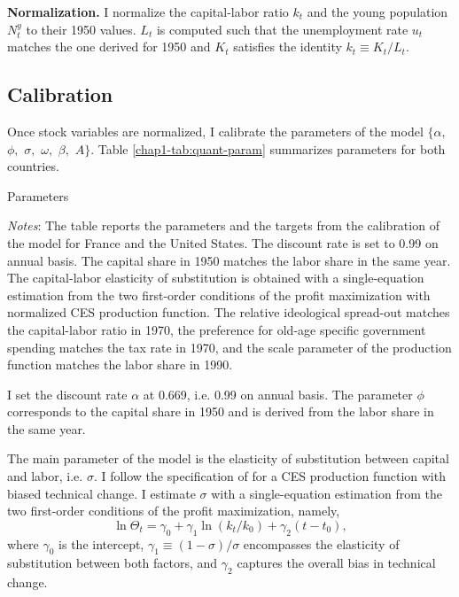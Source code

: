 \textbf{Normalization.} 
I normalize the capital-labor ratio $k_t$ and the young population $N_t^y$ to their 1950 values. $L_t$ is computed such that the unemployment rate $u_t$ matches the one derived for 1950 and $K_t$ satisfies the identity $k_t \equiv K_t/L_t$.

\subsection{Calibration}\label{chap1-calibration}

Once stock variables are normalized, I calibrate the parameters of the model $\{ \alpha,$ $\phi,$ $\sigma,$ $\omega,$ $\beta,$ $A \}$. Table \ref{chap1-tab:quant-param} summarizes parameters for both countries.
\begin{table}[!tb]
    \centering
    \begin{threeparttable}
        \caption{Parameters} \label{chap1-tab:quant-param}
        
        \begin{tablenotes}[flushleft]
            \footnotesize\item \textit{Notes}: The table reports the parameters and the targets from the calibration of the model for France and the United States. The discount rate is set to 0.99 on annual basis. The capital share in 1950 matches the labor share in the same year.
            The capital-labor elasticity of substitution is obtained with a single-equation estimation from the two first-order conditions of the profit maximization with normalized CES production function.
            The relative ideological spread-out matches the capital-labor ratio in 1970, the preference for old-age specific government spending matches the tax rate in 1970, and the scale parameter of the production function matches the labor share in 1990.
        \end{tablenotes}
    \end{threeparttable}
\end{table}
I set the discount rate $\alpha$ at 0.669, i.e. 0.99 on annual basis. 
The parameter $\phi$ corresponds to the capital share in 1950 and is derived from the labor share in the same year. 

The main parameter of the model is the elasticity of substitution between capital and labor, i.e. $\sigma$. I follow the specification of \citet{Klump2007Factor} for a CES production function with biased technical change. %
I estimate $\sigma$ with a single-equation estimation from the two first-order conditions of the profit maximization, namely,
\begin{equation} \label{chap1-eq:est-sigma}
	\ln \Theta_t = \gamma_0 + \gamma_1 \ln (k_t/k_0) + \gamma_2\left(t-t_0\right),
\end{equation}
where $\gamma_0$ is the intercept, $\gamma_1\equiv(1-\sigma)/\sigma$ encompasses the elasticity of substitution between both factors, and $\gamma_2$ captures the overall bias in technical change.


